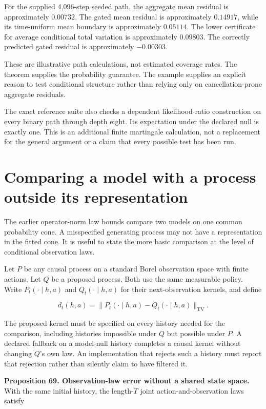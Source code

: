 For the supplied 4,096-step seeded path, the aggregate mean residual is
approximately \(0.00732\). The gated mean residual is approximately
\(0.14917\), while its time-uniform mean boundary is approximately
\(0.05114\). The lower certificate for average conditional total
variation is approximately \(0.09803\). The correctly predicted gated
residual is approximately \(-0.00303\).

These are illustrative path calculations, not estimated coverage rates.
The theorem supplies the probability guarantee. The example supplies an
explicit reason to test conditional structure rather than relying only
on cancellation-prone aggregate residuals.

The exact reference suite also checks a dependent likelihood-ratio
construction on every binary path through depth eight. Its expectation
under the declared null is exactly one. This is an additional finite
martingale calculation, not a replacement for the general argument or a
claim that every possible test has been run.

\section{Comparing a model with a process outside its representation}\label{LSM:comparing-a-model-with-a-process-outside-its-representation}

The earlier operator-norm law bounds compare two models on one common
probability cone. A misspecified generating process may not have a
representation in the fitted cone. It is useful to state the more basic
comparison at the level of conditional observation laws.

Let \(P\) be any causal process on a standard Borel observation space
with finite actions. Let \(Q\) be a proposed process. Both use the same
measurable policy. Write \(P_t(\cdot\mid h,a)\) and
\(Q_t(\cdot\mid h,a)\) for their next-observation kernels, and define

\[
d_t(h,a)=\|P_t(\cdot\mid h,a)-Q_t(\cdot\mid h,a)\|_{\mathrm{TV}}.
\]

The proposed kernel must be specified on every history needed for the
comparison, including histories impossible under \(Q\) but possible
under \(P\). A declared fallback on a model-null history completes a
causal kernel without changing \(Q\)'s own law. An implementation that
rejects such a history must report that rejection rather than silently
claim to have filtered it.

\textbf{Proposition 69. Observation-law error without a shared state
space.} With the same initial history, the length-\(T\) joint
action-and-observation laws satisfy

